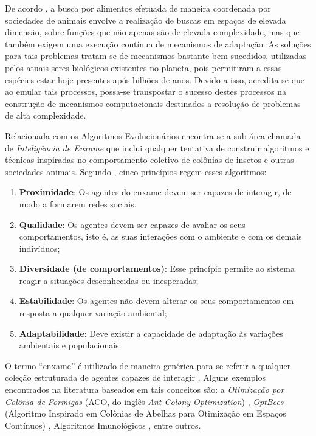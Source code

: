\documentclass[
	12pt,				%
	openany,			%
	oneside,	
	a4paper,			%
	brazil,				%
	]{unimontes-ppgmsc-abntex2}
\begin{document}
De acordo , a busca por alimentos efetuada de maneira coordenada por sociedades de animais envolve a realização de buscas em espaços de elevada dimensão, sobre funções que não apenas são de elevada complexidade, mas que também exigem uma execução contínua de mecanismos de adaptação. As soluções para tais problemas tratam-se de mecanismos bastante bem sucedidos, utilizadas pelos atuais seres biológicos existentes no planeta, pois permitiram a essas espécies estar hoje presentes após bilhões de anos. Devido a isso, acredita-se que ao emular tais processos, possa-se transpostar o sucesso destes processos na construção de mecanismos computacionais destinados a resolução de problemas de alta complexidade.
 
Relacionada com os Algoritmos Evolucionários encontra-se a sub-área chamada de {\em Inteligência de Enxame} que inclui qualquer tentativa de construir algoritmos e técnicas inspiradas no comportamento coletivo de colônias de insetos e outras sociedades animais. Segundo , cinco princípios regem esses algoritmos:

\begin{enumerate}[label=(\roman*)]
\item \textbf{Proximidade}: Os agentes do enxame devem ser capazes de interagir, de modo a formarem redes sociais.
\item \textbf{Qualidade}: Os agentes devem ser capazes de avaliar os seus comportamentos, isto é, as suas interações com o ambiente e com os demais indivíduos;
\item \textbf{Diversidade (de comportamentos)}: Esse princípio permite ao sistema reagir a situações desconhecidas ou inesperadas;
\item \textbf{Estabilidade}: Os agentes não devem  alterar os seus comportamentos em resposta a qualquer variação ambiental;
\item \textbf{Adaptabilidade}: Deve existir a capacidade de adaptação às variações ambientais e populacionais.
\end{enumerate}

O termo ``enxame'' é utilizado de maneira genérica para se  referir a qualquer coleção estruturada de agentes capazes de interagir \cite{VonZuben_2007}. Alguns exemplos encontrados na literatura baseados em tais conceitos são: a {\em Otimização por Colônia de Formigas} (ACO, do inglês {\em Ant Colony Optimization}) \cite{Dorigo_1996}, {\em OptBees} (Algoritmo Inspirado em Colônias de Abelhas para Otimização em Espaços Contínuos) \cite{Renato_2013}, Algoritmos Imunológicos \cite{Castro_2002}, entre outros. 
\end{document}
